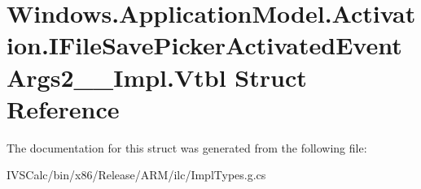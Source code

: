 \hypertarget{struct_windows_1_1_application_model_1_1_activation_1_1_i_file_save_picker_activated_event_args2_____impl_1_1_vtbl}{}\section{Windows.\+Application\+Model.\+Activation.\+I\+File\+Save\+Picker\+Activated\+Event\+Args2\+\_\+\+\_\+\+Impl.\+Vtbl Struct Reference}
\label{struct_windows_1_1_application_model_1_1_activation_1_1_i_file_save_picker_activated_event_args2_____impl_1_1_vtbl}


The documentation for this struct was generated from the following file\+:\begin{DoxyCompactItemize}
\item 
I\+V\+S\+Calc/bin/x86/\+Release/\+A\+R\+M/ilc/Impl\+Types.\+g.\+cs\end{DoxyCompactItemize}
